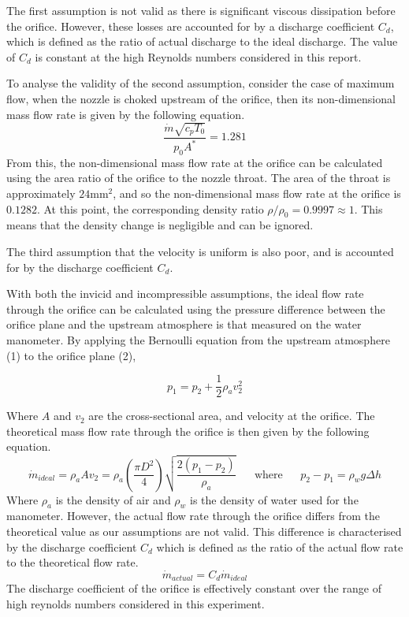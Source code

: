 \documentclass[8pt]{article}
\begin{document}
The first assumption is not valid as there is significant viscous dissipation before the orifice. However, these losses are accounted for by a discharge coefficient $C_d$, which is defined as the ratio of actual discharge to the ideal discharge.
The value of $C_d$ is constant at the high Reynolds numbers considered in this report.

To analyse the validity of the second assumption, consider the case of maximum flow, when the nozzle is choked upstream of the orifice, then its non-dimensional mass flow rate is given by the following equation.
\begin{equation}
    \frac{\dot{m}\sqrt{c_pT_0}}{p_0A^*} = 1.281
\end{equation}
From this, the non-dimensional mass flow rate at the orifice can be calculated using the area ratio of the orifice to the nozzle throat.
The area of the throat is approximately $24\text{mm}^2$, and so the non-dimensional mass flow rate at the orifice is $0.1282$.
At this point, the corresponding density ratio $\rho/\rho_0 = 0.9997 \approx 1$. This means that the density change is negligible and can be ignored.

The third assumption that the velocity is uniform is also poor, and is accounted for by the discharge coefficient $C_d$.

\hfill

With both the invicid and incompressible assumptions, the ideal flow rate through the orifice can be calculated using the pressure difference between the orifice plane and the upstream atmosphere is that measured on the
water manometer. By applying the Bernoulli equation from the upstream atmosphere (1) to the orifice plane (2),

\begin{equation}
    p_1 = p_2 + \frac{1}{2} \rho_a v_2^2
\end{equation}

Where $A$ and $v_2$ are the cross-sectional area, and velocity at the orifice. The theoretical mass flow rate through the orifice is then given by the following equation.
\begin{equation}
    \dot{m}_{ideal} = \rho_a A v_2 = \rho_a \left( \frac{\pi D^2}{4}\right) \sqrt{\frac{2(p_1-p_2)}{\rho_a}} \;\;\;\;\;\; \text{where} \;\;\;\;\;\ p_2 - p_1 = \rho_w g \Delta h
\end{equation}
Where $\rho_a$ is the density of air and $\rho_w$ is the density of water used for the manometer.
However, the actual flow rate through the orifice differs from the theoretical value as our assumptions are not valid.
This difference is characterised by the discharge coefficient $C_d$ which is defined as the ratio of the actual flow rate to the theoretical flow rate.
\begin{equation}
    \dot{m}_{actual} = C_d \dot{m}_{ideal}
\end{equation}
The discharge coefficient of the orifice is effectively constant over the range of high reynolds numbers considered in this experiment. 
\end{document}
